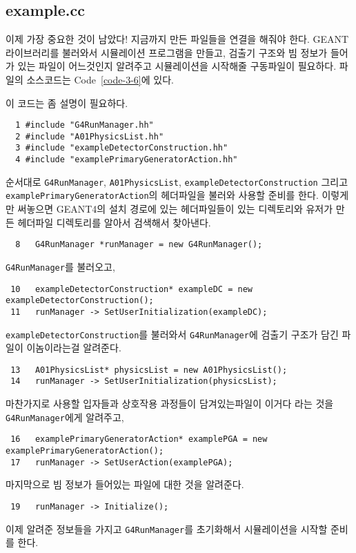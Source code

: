 \subsection{example.cc}

이제 가장 중요한 것이 남았다! 지금까지 만든 파일들을 연결을 해줘야 한다.
GEANT라이브러리를 불러와서 시뮬레이션 프로그램을 만들고, 검출기 구조와 빔
정보가 들어가 있는 파일이 어느것인지 알려주고 시뮬레이션을 시작해줄 구동파일이
필요하다. 파일의 소스코드는 Code~\ref{code-3-6}에 있다.

이 코드는 좀 설명이 필요하다.
\begin{pc}
\begin{lstlisting}
  1 #include "G4RunManager.hh"
  2 #include "A01PhysicsList.hh"
  3 #include "exampleDetectorConstruction.hh"
  4 #include "examplePrimaryGeneratorAction.hh"
\end{lstlisting}
\end{pc}
순서대로 \texttt{G4RunManager}, \texttt{A01PhysicsList},
\texttt{exampleDetectorConstruction} 그리고 \\
\texttt{examplePrimaryGeneratorAction}의 헤더파일을 불러와 사용할 준비를 한다.
이렇게만 써놓으면 GEANT4의 설치 경로에 있는 헤더파일들이 있는 디렉토리와 유저가 만든
헤더파일 디렉토리를 알아서 검색해서 찾아낸다.
\begin{pc}
\begin{lstlisting}
  8   G4RunManager *runManager = new G4RunManager();
\end{lstlisting}
\end{pc}
\texttt{G4RunManager}를 불러오고,
\begin{pc}
\begin{lstlisting}
 10   exampleDetectorConstruction* exampleDC = new exampleDetectorConstruction();
 11   runManager -> SetUserInitialization(exampleDC);
\end{lstlisting}
\end{pc}
\texttt{exampleDetectorConstruction}를 불러와서 \texttt{G4RunManager}에 검출기
구조가 담긴 파일이 이놈이라는걸 알려준다.
\begin{pc}
\begin{lstlisting}
 13   A01PhysicsList* physicsList = new A01PhysicsList();
 14   runManager -> SetUserInitialization(physicsList);
\end{lstlisting}
\end{pc}
마찬가지로 사용할 입자들과 상호작용 과정들이 담겨있는파일이 이거다 라는 것을 \\
\texttt{G4RunManager}에게 알려주고, 
\begin{pc}
\begin{lstlisting}
 16   examplePrimaryGeneratorAction* examplePGA = new examplePrimaryGeneratorAction();
 17   runManager -> SetUserAction(examplePGA);
\end{lstlisting}
\end{pc}
마지막으로 빔 정보가 들어있는 파일에 대한 것을 알려준다.
\begin{pc}
\begin{lstlisting}
 19   runManager -> Initialize();
\end{lstlisting}
\end{pc}
이제 알려준 정보들을 가지고 \texttt{G4RunManager}를 초기화해서 시뮬레이션을
시작할 준비를 한다.

